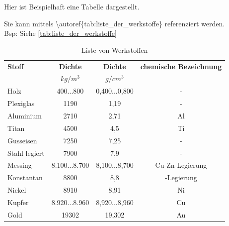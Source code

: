 \newpage
Hier ist Beispielhaft eine Tabelle dargestellt.

Sie kann mittels \textbackslash autoref\{tab:liste\_der\_werkstoffe\} referenziert werden.\\
Bsp: \glqq Siehe \autoref{tab:liste_der_werkstoffe}\grqq

\begin{table}[htb]
    \begin{tabular}{lccc}\toprule                   %
    \textbf{Stoff}	&\textbf{Dichte} &\textbf{Dichte} &\textbf{chemische Bezeichnung}	\\
                & \(kg/m^{3}\)	& \(g/cm^3\) 	& \\\midrule         %
    Holz		& 400...800	& 0,400...0,800	&- \\
    Plexiglas 	& 1190	& 1,19	& - 	\\
    Aluminium	& 2710	& 2,71	& Al	\\
    Titan		& 4500	& 4,5	& Ti	\\
    Gusseisen	& 7250	& 7,25	& - \\
    Stahl legiert& 7900	& 7,9	& - \\
    Messing		& 8.100...8.700	& 8,100...8,700	& Cu-Zn-Legierung\\
    Konstantan	& 8800	& 8,8	& \ch{Cu55Ni45}-Legierung\\
    Nickel		& 8910	& 8,91  & Ni \\
    Kupfer		& 8.920...8.960	& 8,920...8,960	& Cu\\
    Gold		& 19302	& 19,302& Au	\\\bottomrule               %
    \end{tabular}
    \caption{Liste von Werkstoffen}
    \label{tab:liste_der_werkstoffe}
\end{table}